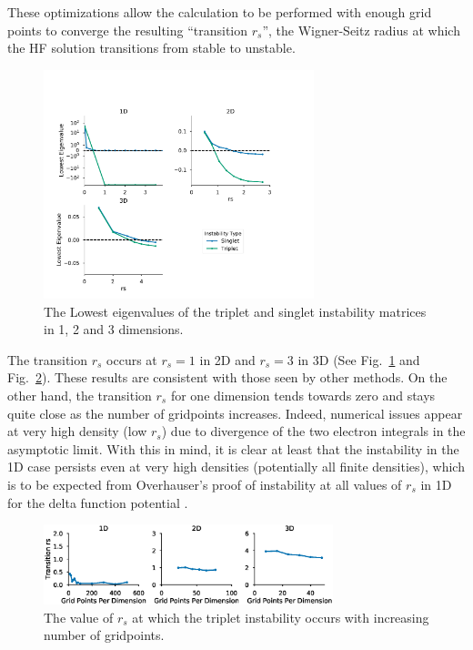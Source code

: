 \documentclass{revtex4}
\begin{document}
     
     These optimizations allow the calculation to be performed with enough grid points to converge 
     the resulting ``transition $r_s$'', the Wigner-Seitz radius at which the HF solution 
     transitions 
     from stable to unstable.          
      \begin{figure}[H]
      \centering
        \includegraphics[width=0.7\textwidth]{../figures/stability.pdf}
        \caption{The Lowest eigenvalues of the triplet and singlet instability matrices in 1, 2 and
        3 dimensions.}
        \label{fig:stability}
      \end{figure}   
        
    The transition $r_s$ occurs at $r_s = 1$ in 2D and $r_s = 3$ in 3D (See 
    Fig.~\ref{fig:stability} and Fig.~\ref{fig:onset}). These 
    results are consistent with those seen by other methods\cite{Baguet2014, Bernu2011}. On 
    the other hand, the transition 
    $r_s$ for one dimension tends towards zero and stays quite close as the number of gridpoints 
    increases. Indeed, numerical issues appear at very high density (low $r_s$) due to divergence 
    of the two electron integrals in the asymptotic limit. With this in mind, it is clear at least 
    that the instability in the 1D case persists even at very high densities (potentially all 
    finite densities), which is to be expected from Overhauser's proof of instability at all 
    values of $r_s$ in 1D for the delta function potential \cite{Overhauser1962}.


    \begin{figure}[H]
    \centering
      \includegraphics[width=0.75\textwidth]{../figures/triplet_onset.eps}
      \caption{The value of $r_s$ at which the triplet instability occurs with increasing number of 
      gridpoints.}
      \label{fig:onset}
    \end{figure}
    
\end{document}
